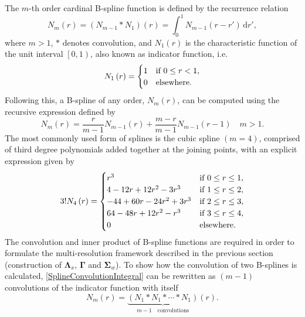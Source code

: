 \documentclass[11pt,draftcls,onecolumn,peerreview]{IEEEtran}
\begin{document}
The $m$-th  order cardinal B-spline function is defined by the recurrence relation \cite{Chui1992} 
\begin{equation}
N_{m}\left(r\right) = \left(N_{m-1}\ast N_{1}\right)\left(r\right) = \int_0^{1} N_{m-1}\left( r-r'\right)\,\mathrm{d}r',
\label{SplineConvolutionIntegral}
\end{equation}
where $m>1$, $\ast$ denotes convolution, and $N_1\left(r\right)$ is the characteristic function of the unit interval $\left[ 0,1\right)$, also known as indicator function, i.e.
\begin{equation}
N_{1}\left(r\right)=
\begin{cases}
1 & \text{if $ 0\le r<1$}, \\
0 & \mathrm{elsewhere}.
\end{cases}
\end{equation}
Following this, a B-spline of any order, $N_m(r)$, can be computed using the recursive expression defined by \cite{DeBoor2001}
\begin{equation}\label{eq:MRA-DoBoorFormula}
 N_{m}\left(r\right)=\frac{r}{m-1}N_{m-1}\left(r\right)+\frac{m-r}{m-1}N_{m-1}\left(r-1\right) \quad m>1.
 \end{equation}
The most commonly used form of splines is the cubic spline $\left(m=4\right)$, comprised of third degree polynomials added together at the joining points, with an explicit expression given by
\begin{align}
3!N_{4}\left(r\right)=
\begin{cases}
r^3 & \text{if $ 0\le r\le1$}, \\
4-12r+12r^2-3r^3 & \text{if $1\le r\le2$}, \\
-44+60r-24r^2+3r^3 & \text{if $2\le r\le3$}, \\
64-48r+12r^2-r^3 & \text{if $3\le r\le4$}, \\
0 & \mathrm{elsewhere}.
\end{cases}
\end{align}
The convolution and inner product of B-spline functions are required in order to formulate the multi-resolution framework described in the previous section (construction of $\boldsymbol\Lambda_{x}$, $\boldsymbol\Gamma$ and $\boldsymbol\Sigma_w$). To show how the convolution of two B-splines is calculated, \eqref{SplineConvolutionIntegral} can be rewritten as $(m-1)$ convolutions of the indicator function with itself
\begin{equation}\label{eq:N1convolutions}
 N_{m}\left(r\right)=\underbrace{\left(N_{1}\ast N_{1}\ast \cdots \ast N_{1}\right)}_{m-1\quad \text{convolutions}}\left(r\right).
\end{equation}
\end{document}
